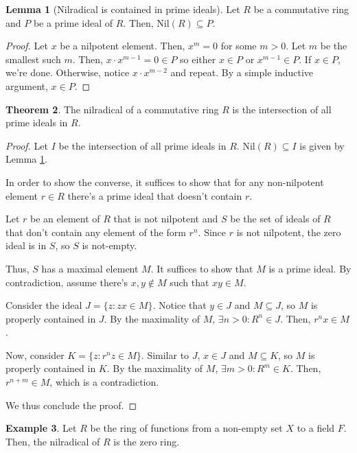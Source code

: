 \documentclass{article}
\theoremstyle{definition}
\newtheorem{theorem}{Theorem}[section]
\newtheorem{lemma}[theorem]{Lemma}
\newtheorem{example}[theorem]{Example}
\newcommand{\Nil}{\text{Nil}}
\begin{document}
\begin{lemma}[Nilradical is contained in prime ideals]\label{nilradical_is_contained_in_prime_ideals}
    Let $R$ be a commutative ring and $P$ be a prime ideal of $R$.
    Then, $\Nil(R) \subseteq P$.
\end{lemma}
\begin{proof}
    Let $x$ be a nilpotent element. Then, $x^{m} = 0$ for some 
    $m > 0$. Let $m$ be the smallest such $m$. Then, $x \cdot x^{m-1} = 0 \in P$ 
    so either $x \in P$ or $x^{m-1} \in P$. If $x \in P$, we're done.
    Otherwise, notice $x \cdot x^{m-2}$ and repeat. By a simple inductive
    argument, $x \in P$.
\end{proof}

\begin{theorem}
    The nilradical of a commutative ring $R$ is the 
    intersection of all prime ideals in $R$.
\end{theorem}
\begin{proof}
    Let $I$ be the intersection of all prime ideals in $R$.
    $\Nil(R) \subseteq I$ is given by Lemma \ref{nilradical_is_contained_in_prime_ideals}.

    In order to show the converse, it suffices to show that for any
    non-nilpotent element $r \in R$  there's a prime ideal that doesn't
    contain $r$. 
    
    Let $r$ be an element of $R$ that is not nilpotent and $S$ be the 
    set of ideals of $R$ that don't contain any element of the form $r^{n}$.
    Since $r$ is not nilpotent, the zero ideal is in $S$, so $S$ is not-empty.

    Thus, $S$ has a maximal element $M$. It suffices to show that $M$ is a prime ideal.
    By contradiction, assume there's $x,y \notin M$ such that 
    $xy \in M$.

    Consider the ideal $J = \{ z: zx \in M\}$. Notice that 
    $y \in J$ and $M \subseteq J$, so $M$ is properly contained 
    in $J$. By the maximality of $M$, $\exists n > 0: R^{n} \in J$.
    Then, $r^{n}x \in M$.

    Now, consider $K = \{z: r^{n}z \in M\}$. Similar to $J$,
    $x \in J$ and $M \subseteq K$, so $M$ is properly contained in $K$.
    By the maximality of $M$, $\exists m > 0: R^{m} \in K$.
    Then, $r^{n + m} \in M$, which is a contradiction.
    
    We thus conclude the proof.
\end{proof}

\begin{example}
    Let $R$ be the ring of functions from a non-empty set $X$
    to a field $F$. Then, the nilradical of $R$ is the zero ring.
\end{example}
\end{document}
